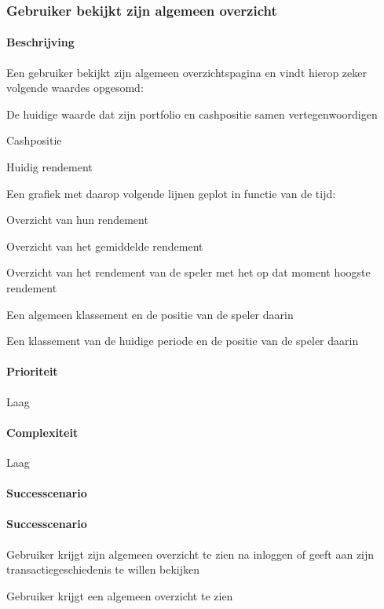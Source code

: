 \subsubsection{Gebruiker bekijkt zijn algemeen overzicht}
\begin{compact}
\paragraph{Beschrijving} Een gebruiker bekijkt zijn algemeen overzichtspagina en vindt hierop zeker volgende waardes opgesomd:
\begin{itemize_compact}
	\item De huidige waarde dat zijn portfolio en cashpositie samen vertegenwoordigen
	\item Cashpositie
	\item Huidig rendement
	\item Een grafiek met daarop volgende lijnen geplot in functie van de tijd:
  \begin{itemize_compact}
  	\item  Overzicht van hun rendement
    \item Overzicht van het gemiddelde rendement
    \item Overzicht van het rendement van de speler met het op dat moment hoogste rendement
  \end{itemize_compact}
  \item Een algemeen klassement en de positie van de speler daarin
  \item Een klassement van de huidige periode en de positie van de speler daarin
\end{itemize_compact}
\paragraph{Prioriteit}Laag
\paragraph{Complexiteit}Laag
\paragraph{Successcenario}
\paragraph{Successcenario}
\begin{enumerate_compact}
 \item Gebruiker krijgt zijn algemeen overzicht te zien na inloggen of geeft aan zijn transactiegeschiedenis te willen bekijken
 \item Gebruiker krijgt een algemeen overzicht te zien
\end{enumerate_compact}
\end{compact}


